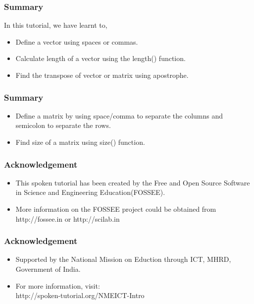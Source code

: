\documentclass[17pt]{beamer}
\begin{document}
\begin{frame}[fragile]
\frametitle{Summary}
In this tutorial, we have learnt to,
\begin{itemize}
\item Define a vector using spaces or commas.
\item Calculate length of a vector using the length() function.
\item Find the transpose of vector or matrix using apostrophe.
\end{itemize}
\end{frame}  

\begin{frame}[fragile]
\frametitle{Summary}
\begin{itemize}
\item Define a matrix by using space/comma to separate the columns and semicolon to separate the rows.
\item Find size of a matrix using size() function.
\end{itemize}
\end{frame}


\begin{frame}[fragile]
\frametitle{Acknowledgement}
\begin{itemize}
\item This spoken tutorial has been created by the Free and Open Source Software in Science and Engineering Education(FOSSEE).\pause
\item More information on the FOSSEE project could be obtained from {\color{magenta}http://fossee.in} or {\color{magenta}http://scilab.in}\pause
\end{itemize}
\end{frame}

\begin{frame}[fragile]
\frametitle{Acknowledgement}
\begin{itemize}
\item Supported by the National Mission on Eduction through ICT, MHRD, Government of India.\pause
\item For more information, visit: \\
	{\color{magenta}http://spoken-tutorial.org/NMEICT-Intro}

\end{itemize}
\end{frame}
\end{document}
